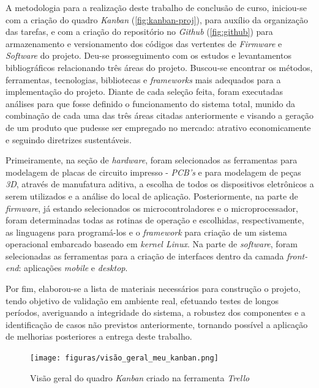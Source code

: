 A metodologia para a realização deste trabalho de conclusão de curso, iniciou-se com a criação do quadro \textit{Kanban} (\autoref{fig:kanban-proj}), para auxílio da organização das tarefas, e com a criação do repositório no \textit{Github} (\autoref{fig:github}) para armazenamento e versionamento dos códigos das vertentes de \textit{Firmware} e \textit{Software} do projeto. Deu-se prosseguimento com os estudos e levantamentos bibliográficos relacionando três áreas do projeto. Buscou-se encontrar os métodos,  ferramentas, tecnologias, bibliotecas e \textit{frameworks} mais adequados para a implementação do projeto.  Diante de cada seleção feita, foram executadas análises para que fosse definido o funcionamento do sistema total, munido da combinação de cada uma das três áreas citadas anteriormente e visando a geração de um produto que pudesse ser empregado no mercado: atrativo economicamente e seguindo diretrizes sustentáveis.  

Primeiramente, na seção de \textit{hardware}, foram selecionados as ferramentas para modelagem de placas de circuito impresso - \textit{PCB's} e para modelagem de peças \textit{3D}, através de manufatura aditiva, a escolha de todos os dispositivos eletrônicos a serem utilizados e a análise do local de aplicação. Posteriormente, na parte de \textit{firmware}, já estando selecionados os microcontroladores e o microprocessador, foram determinadas todas as rotinas de operação e escolhidas, respectivamente, as linguagens para programá-los e o \textit{framework} para criação de um sistema operacional embarcado baseado em \textit{kernel Linux}. Na parte de \textit{software}, foram selecionadas as ferramentas para a criação de interfaces dentro da camada \textit{front-end}: aplicações \textit{mobile} e \textit{desktop}.

Por fim, elaborou-se a lista de materiais necessários para construção o projeto, tendo objetivo de validação em ambiente real, efetuando testes de longos períodos, averiguando a integridade do sistema, a robustez dos componentes e a identificação de casos não previstos anteriormente, tornando possível a aplicação de melhorias posteriores a entrega deste trabalho.

\begin{figure}[H]
	\centering
	\caption{Visão geral do quadro \textit{Kanban} criado na ferramenta \textit{Trello}}
	\texttt{[image: figuras/visão\_geral\_meu\_kanban.png]}
	\label{fig:kanban-proj}
\end{figure}



